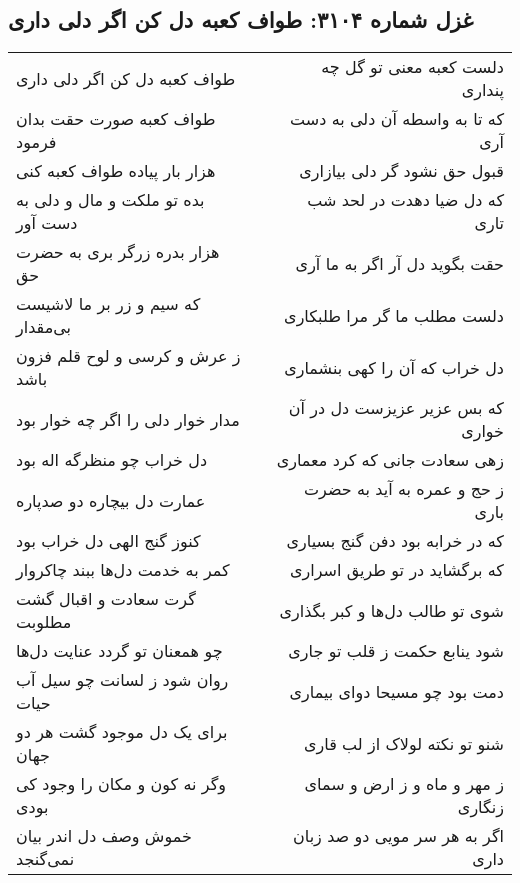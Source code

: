 \begin{center}
\section*{غزل شماره ۳۱۰۴: طواف کعبه دل کن اگر دلی داری}
\label{sec:3104}
\begin{longtable}{l p{0.5cm} r}
طواف کعبه دل کن اگر دلی داری
&&
دلست کعبه معنی تو گل چه پنداری
\\
طواف کعبه صورت حقت بدان فرمود
&&
که تا به واسطه آن دلی به دست آری
\\
هزار بار پیاده طواف کعبه کنی
&&
قبول حق نشود گر دلی بیازاری
\\
بده تو ملکت و مال و دلی به دست آور
&&
که دل ضیا دهدت در لحد شب تاری
\\
هزار بدره زرگر بری به حضرت حق
&&
حقت بگوید دل آر اگر به ما آری
\\
که سیم و زر بر ما لاشیست بی‌مقدار
&&
دلست مطلب ما گر مرا طلبکاری
\\
ز عرش و کرسی و لوح قلم فزون باشد
&&
دل خراب که آن را کهی بنشماری
\\
مدار خوار دلی را اگر چه خوار بود
&&
که بس عزیر عزیزست دل در آن خواری
\\
دل خراب چو منظرگه اله بود
&&
زهی سعادت جانی که کرد معماری
\\
عمارت دل بیچاره دو صدپاره
&&
ز حج و عمره به آید به حضرت باری
\\
کنوز گنج الهی دل خراب بود
&&
که در خرابه بود دفن گنج بسیاری
\\
کمر به خدمت دل‌ها ببند چاکروار
&&
که برگشاید در تو طریق اسراری
\\
گرت سعادت و اقبال گشت مطلوبت
&&
شوی تو طالب دل‌ها و کبر بگذاری
\\
چو همعنان تو گردد عنایت دل‌ها
&&
شود ینابع حکمت ز قلب تو جاری
\\
روان شود ز لسانت چو سیل آب حیات
&&
دمت بود چو مسیحا دوای بیماری
\\
برای یک دل موجود گشت هر دو جهان
&&
شنو تو نکته لولاک از لب قاری
\\
وگر نه کون و مکان را وجود کی بودی
&&
ز مهر و ماه و ز ارض و سمای زنگاری
\\
خموش وصف دل اندر بیان نمی‌گنجد
&&
اگر به هر سر مویی دو صد زبان داری
\\
\end{longtable}
\end{center}
